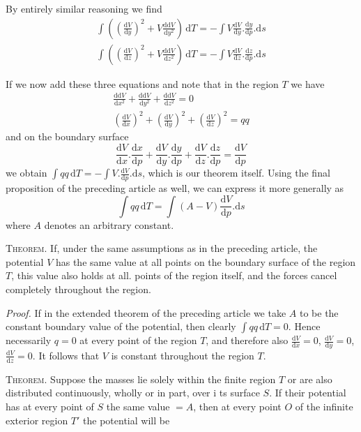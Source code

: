 By entirely similar reasoning we find
\[
\begin{gathered}
\int((\frac{\mathrm dV}{\mathrm dy})^2+V\frac{\mathrm d\mathrm dV}{\mathrm dy^2})\,\mathrm dT=-\int V\frac{\mathrm dV}{\mathrm dy}.\frac{\mathrm dy}{\mathrm dp}.\mathrm ds\\
\int((\frac{\mathrm dV}{\mathrm dz})^2+V\frac{\mathrm d\mathrm dV}{\mathrm dz^2})\,\mathrm dT=-\int V\frac{\mathrm dV}{\mathrm dz}.\frac{\mathrm dz}{\mathrm dp}.\mathrm ds
\end{gathered}
\]

If we now add these three equations and note that in the region $T$ we have
\[
\begin{gathered}
\frac{\mathrm d\mathrm dV}{\mathrm dx^2}+\frac{\mathrm d\mathrm dV}{\mathrm dy^2}+\frac{\mathrm d\mathrm dV}{\mathrm dz^2}=0\\
(\frac{\mathrm dV}{\mathrm dx})^2+(\frac{\mathrm dV}{\mathrm dy})^2+(\frac{\mathrm dV}{\mathrm dz})^2=qq
\end{gathered}
\]
and on the boundary surface
\[
\frac{\mathrm dV}{\mathrm dx}.\frac{\mathrm dx}{\mathrm dp}+\frac{\mathrm dV}{\mathrm dy}.\frac{\mathrm dy}{\mathrm dp}+\frac{\mathrm dV}{\mathrm dz}.\frac{\mathrm dz}{\mathrm dp}=\frac{\mathrm dV}{\mathrm dp}
\]
we obtain $\int qq\,\mathrm dT=-\int V.\frac{\mathrm dV}{\mathrm dp}.\mathrm ds$, which is our theorem itself. Using the final proposition of the preceding article as well, we can express it more generally as
\[
\int qq\,\mathrm dT=\int(A-V)\frac{\mathrm dV}{\mathrm dp}.\mathrm ds
\]
where $A$ denotes an arbitrary constant.

\textsc{Theorem.} If, under the same assumptions as in the preceding article, the potential $V$ has the same value at all points on the boundary surface of the region $T$, this value also holds at all. points of the region itself, and the forces cancel completely throughout the region.

\textit{Proof.} If in the extended theorem of the preceding article we take $A$ to be the constant boundary value of the potential, then clearly $\int qq\,\mathrm dT=0$. Hence necessarily $q=0$ at every point of the region $T$, and therefore also $\frac{\mathrm dV}{\mathrm dx}=0$, $\frac{\mathrm dV}{\mathrm dy}=0$, $\frac{\mathrm dV}{\mathrm dz}=0$. It follows that $V$ is constant throughout the region $T$.

\textsc{Theorem.} Suppose the masses lie solely within the finite region $T$ or are also distributed continuously, wholly or in part, over i%
%
ts surface $S$. If their potential has at every point of $S$ the same value $=A$, then at every point $O$ of the infinite exterior region $T'$ the potential will be

